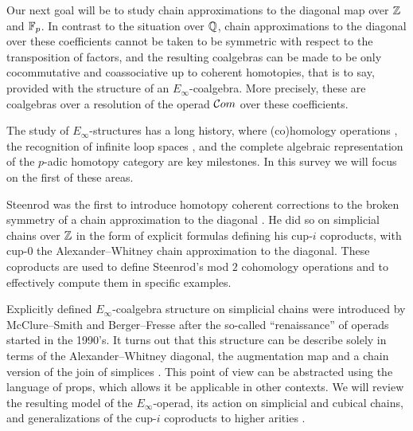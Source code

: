 Our next goal will be to study chain approximations to the diagonal map over $\mathbb{Z}$ and ${\mathbb{F}_p}$.
In contrast to the situation over $\mathbb{Q}$, chain approximations to the diagonal over these coefficients cannot be taken to be symmetric with respect to the transposition of factors, and the resulting coalgebras can be made to be only cocommutative and coassociative up to coherent homotopies, that is to say, provided with the structure of an $E_\infty$-coalgebra.
More precisely, these are coalgebras over a resolution of the operad $\mathcal{C}om$ over these coefficients.

The study of $E_\infty$-structures has a long history, where (co)homology operations \cite{steenrod1962cohomology, may1970general}, the recognition of infinite loop spaces \cite{boardman1973homotopy, may1972geometry}, and the complete algebraic representation of the $p$-adic homotopy category \cite{mandell2001padic} are key milestones.
In this survey we will focus on the first of these areas.

Steenrod was the first to introduce homotopy coherent corrections to the broken symmetry of a chain approximation to the diagonal \cite{steenrod1947products}.
He did so on simplicial chains over $\mathbb{Z}$ in the form of explicit formulas defining his cup-$i$ coproducts, with \mbox{cup-$0$} the Alexander--Whitney chain approximation to the diagonal.
These coproducts are used to define Steenrod's mod $2$ cohomology operations and to effectively compute them in specific examples.

Explicitly defined $E_\infty$-coalgebra structure on simplicial chains were introduced by McClure--Smith \cite{mcclure2003multivariable} and Berger--Fresse \cite{berger2004combinatorial} after the so-called ``renaissance'' of operads started in the 1990's.
It turns out that this structure can be describe solely in terms of the Alexander--Whitney diagonal, the augmentation map and a chain version of the join of simplices \cite{medina2020prop1}.
This point of view can be abstracted using the language of props, which allows it be applicable in other contexts.
We will review the resulting model of the $E_\infty$-operad, its action on simplicial and cubical chains, and generalizations of the cup-$i$ coproducts to higher arities \cite{medina2020maysteenrod}.